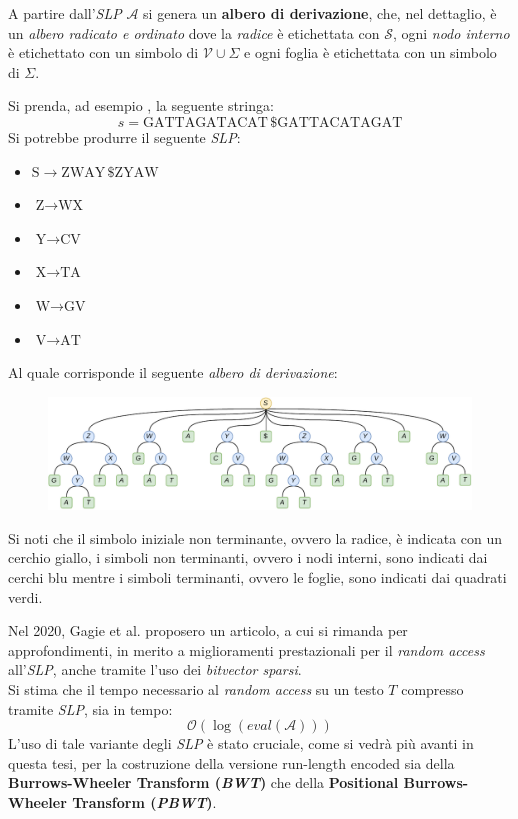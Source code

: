 A partire dall'\textit{SLP} $\mathcal{A}$ si genera un \textbf{albero
  di derivazione}, che, nel dettaglio, è un \textit{albero radicato e ordinato}
dove la \textit{radice} è etichettata con $\mathcal{S}$, ogni \textit{nodo
  interno} è etichettato con un simbolo di $\mathcal{V}\cup\Sigma$ e ogni foglia
è etichettata con un simbolo di $\Sigma$.
\begin{esempio}
  \label{ese:slpgagie}
  Si prenda, ad esempio \cite{slpgagie}, la seguente stringa:
  \[s=\mbox{GATTAGATACAT}\,\$\mbox{GATTACATAGAT}\]
  Si potrebbe produrre il seguente \emph{SLP}:
  \begin{multicols}{2}
    \begin{itemize}
      \item $\mbox{S}\to \mbox{ZWAY}\,\$\mbox{ZYAW}$
      \item $\mbox{Z}\to \mbox{WX}$
      \item $\mbox{Y}\to \mbox{CV}$
      \item $\mbox{X}\to \mbox{TA}$
      \item $\mbox{W}\to \mbox{GV}$
      \item $\mbox{V}\to \mbox{AT}$
    \end{itemize}
  \end{multicols}
  Al quale corrisponde il seguente \emph{albero di derivazione}:
  \begin{figure}[H]
    \centering
    \includegraphics[width=\textwidth]{img/slpgagie.pdf}
  \end{figure}
  Si noti che il simbolo
  iniziale non terminante, ovvero la radice, è indicata con un cerchio giallo, i
  simboli non terminanti, ovvero i nodi interni, sono indicati dai cerchi blu
  mentre i simboli terminanti, ovvero le foglie, sono indicati dai quadrati
  verdi.
\end{esempio}
Nel 2020, Gagie et al. \cite{slpgagie} 
proposero un articolo, a cui si rimanda per approfondimenti, in merito a
miglioramenti prestazionali per il \textit{random access} all'\textit{SLP},
anche tramite l'uso dei \textit{bitvector sparsi}.\\
Si stima che il tempo necessario al
\textit{random access} su un testo $T$ compresso tramite
\textit{SLP}, sia in tempo:
\begin{equation}
  \label{eq:slptime}
  \mathcal{O}\left(\log (eval(\mathcal{A}))\right)
\end{equation}
L'uso di tale variante degli \textit{SLP} è stato cruciale, come si vedrà più
avanti in questa tesi, per la costruzione della versione run-length encoded sia
della \textbf{Burrows-Wheeler Transform (\textit{BWT})} che della
\textbf{Positional Burrows-Wheeler Transform (\textit{PBWT})}.
